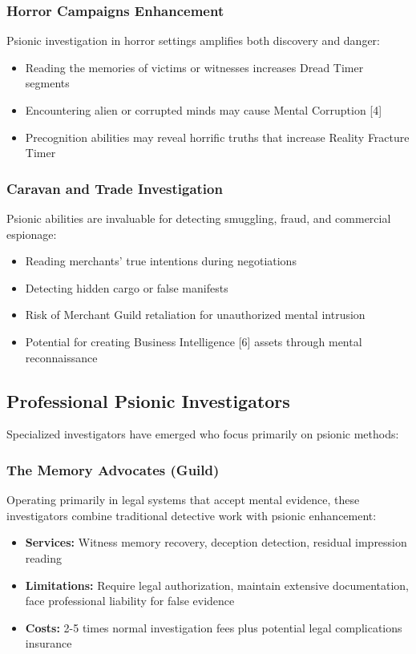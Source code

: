 \documentclass[11pt,twoside]{article}
\begin{document}
\subsubsection{Horror Campaigns Enhancement}
Psionic investigation in horror settings amplifies both discovery and danger:
\begin{itemize}
    \item Reading the memories of victims or witnesses increases Dread Timer segments
    \item Encountering alien or corrupted minds may cause Mental Corruption [4]
    \item Precognition abilities may reveal horrific truths that increase Reality Fracture Timer 
\end{itemize}

\subsubsection{Caravan and Trade Investigation}
Psionic abilities are invaluable for detecting smuggling, fraud, and commercial espionage:
\begin{itemize}
    \item Reading merchants' true intentions during negotiations
    \item Detecting hidden cargo or false manifests
    \item Risk of Merchant Guild retaliation for unauthorized mental intrusion
    \item Potential for creating Business Intelligence [6] assets through mental reconnaissance
\end{itemize}

\subsection{Professional Psionic Investigators}

Specialized investigators have emerged who focus primarily on psionic methods:

\subsubsection{The Memory Advocates (Guild)}
Operating primarily in legal systems that accept mental evidence, these investigators combine traditional detective work with psionic enhancement:
\begin{itemize}
    \item \textbf{Services:} Witness memory recovery, deception detection, residual impression reading
    \item \textbf{Limitations:} Require legal authorization, maintain extensive documentation, face professional liability for false evidence
    \item \textbf{Costs:} 2-5 times normal investigation fees plus potential legal complications insurance
\end{itemize}
\end{document}

